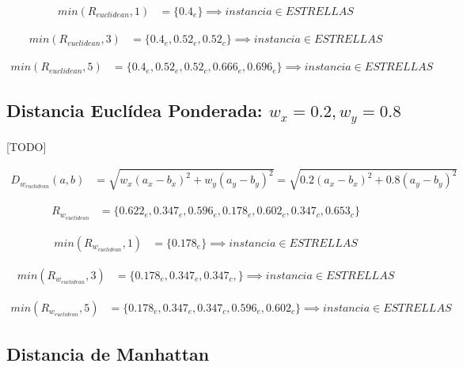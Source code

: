 \documentclass{article}
\begin{document}
			\begin{align}
				min(R_{euclidean},1) &= \{ 0.4_e \} \implies instancia \in ESTRELLAS
			\end{align}

			\begin{align}
				min(R_{euclidean},3) &= \{ 0.4_e, 0.52_e, 0.52_c\} \implies instancia \in ESTRELLAS
			\end{align}

			\begin{align}
				min(R_{euclidean},5) &= \{ 0.4_e, 0.52_e, 0.52_c, 0.666_e,  0.696_e \} \implies instancia \in ESTRELLAS
			\end{align}

		\subsection{Distancia Euclídea Ponderada: $w_x=0.2, w_y=0.8$}

			\paragraph{}
			[TODO]

			\begin{align}
				D_{w_{euclidean}}(a,b) &= \sqrt{w_x(a_x - b_x)^2 + w_y(a_y - b_y)^2} = \sqrt{0.2(a_x - b_x)^2 + 0.8(a_y - b_y)^2}
			\end{align}

			\begin{align}
				R_{w_{euclidean}} &= \{0.622_e, 0.347_e, 0.596_e, 0.178_e, 0.602_c, 0.347_c, 0.653_c\}
			\end{align}

			\begin{align}
				min(R_{w_{euclidean}},1) &= \{ 0.178_e \}  \implies instancia \in ESTRELLAS
			\end{align}

			\begin{align}
				min(R_{w_{euclidean}},3) &= \{ 0.178_e, 0.347_e, 0.347_c,\}  \implies instancia \in ESTRELLAS
			\end{align}

			\begin{align}
				min(R_{w_{euclidean}},5) &= \{ 0.178_e, 0.347_e, 0.347_c, 0.596_e, 0.602_c\} \implies instancia \in ESTRELLAS
			\end{align}


		\subsection{Distancia de Manhattan}
\end{document}
